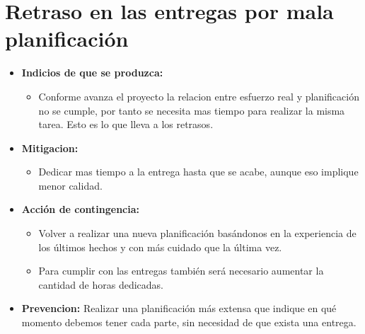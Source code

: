 \documentclass[spanish,a4paper,11pt, twoside]{report}	%
\begin{document}
	\section{Retraso en las entregas por mala planificación}
		\begin{itemize}
			\item \textbf {Indicios de que se produzca: }
				\begin{itemize}
				  \item Conforme avanza el proyecto la
						relacion entre esfuerzo real y planificación no se cumple, por tanto se necesita
						mas tiempo para realizar la misma tarea. Esto es lo que lleva a los retrasos.
				\end{itemize}
			\item \textbf {Mitigacion: }
				\begin{itemize}
				  \item Dedicar mas tiempo a la entrega hasta que se acabe,
					aunque eso implique menor calidad.
				\end{itemize}
			\item \textbf {Acción de contingencia: }
				\begin{itemize}
				  \item Volver a realizar una nueva
						planificación basándonos en la experiencia de los últimos hechos y con más
						cuidado que la última vez. 
				  \item Para cumplir con las entregas también será necesario
						aumentar la cantidad de horas dedicadas.
				\end{itemize}
			\item \textbf {Prevencion: }Realizar una planificación más extensa que indique
				en qué momento debemos tener cada parte, sin necesidad de que exista una
				entrega.
		
		\end{itemize}
	
\end{document}
